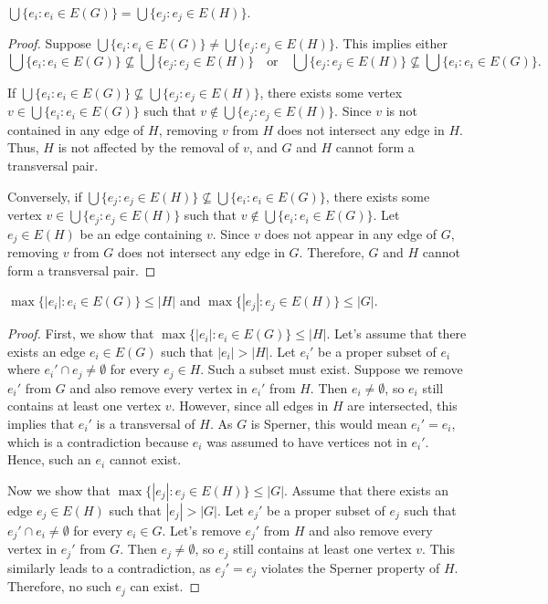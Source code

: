 \begin{proposition}\label{prop:support}
$\bigcup\{e_i:e_i\in E(G)\}=\bigcup\{e_j:e_j\in E(H)\}$.
\end{proposition}

\begin{proof}
Suppose $\bigcup\{e_i:e_i\in E(G)\}\neq\bigcup\{e_j:e_j\in E(H)\}$. This implies either
\[
\bigcup\{e_i:e_i\in E(G)\}\nsubseteq\bigcup\{e_j:e_j\in E(H)\}\quad\text{or}\quad\bigcup\{e_j:e_j\in E(H)\}\nsubseteq\bigcup\{e_i:e_i\in E(G)\}.
\]

If $\bigcup\{e_i:e_i\in E(G)\}\nsubseteq\bigcup\{e_j:e_j\in E(H)\}$, there exists some vertex $v\in\bigcup\{e_i:e_i\in E(G)\}$ such that $v\notin\bigcup\{e_j:e_j\in E(H)\}$. Since $v$ is not contained in any edge of $H$, removing $v$ from $H$ does not intersect any edge in $H$. Thus, $H$ is not affected by the removal of $v$, and $G$ and $H$ cannot form a transversal pair.

Conversely, if $\bigcup\{e_j:e_j\in E(H)\}\nsubseteq\bigcup\{e_i:e_i\in E(G)\}$, there exists some vertex $v\in\bigcup\{e_j:e_j\in E(H)\}$ such that $v\notin\bigcup\{e_i:e_i\in E(G)\}$. Let $e_j\in E(H)$ be an edge containing $v$. Since $v$ does not appear in any edge of $G$, removing $v$ from $G$ does not intersect any edge in $G$. Therefore, $G$ and $H$ cannot form a transversal pair.
\end{proof}

\begin{proposition}\label{prop:size}
$\max\{|e_i|:e_i\in E(G)\}\leq|H|$ and $\max\{|e_j|:e_j\in E(H)\}\leq|G|$.
\end{proposition}

\begin{proof}
First, we show that $\max\{|e_i|:e_i\in E(G)\}\leq|H|$. Let's assume that there exists an edge $e_i\in E(G)$ such that $|e_i|>|H|$. Let $e_i'$ be a proper subset of $e_i$ where $e_i'\cap e_j\neq\emptyset$ for every $e_j\in H$. Such a subset must exist. Suppose we remove $e_i'$ from $G$ and also remove every vertex in $e_i'$ from $H$. Then $e_i\neq\emptyset$, so $e_i$ still contains at least one vertex $v$. However, since all edges in $H$ are intersected, this implies that $e_i'$ is a transversal of $H$. As $G$ is Sperner, this would mean $e_i'=e_i$, which is a contradiction because $e_i$ was assumed to have vertices not in $e_i'$. Hence, such an $e_i$ cannot exist.

Now we show that $\max\{|e_j|:e_j\in E(H)\}\leq|G|$. Assume that there exists an edge $e_j\in E(H)$ such that $|e_j|>|G|$. Let $e_j'$ be a proper subset of $e_j$ such that $e_j'\cap e_i\neq\emptyset$ for every $e_i\in G$. Let's remove $e_j'$ from $H$ and also remove every vertex in $e_j'$ from $G$. Then $e_j\neq\emptyset$, so $e_j$ still contains at least one vertex $v$. This similarly leads to a contradiction, as $e_j'=e_j$ violates the Sperner property of $H$. Therefore, no such $e_j$ can exist.
\end{proof}

